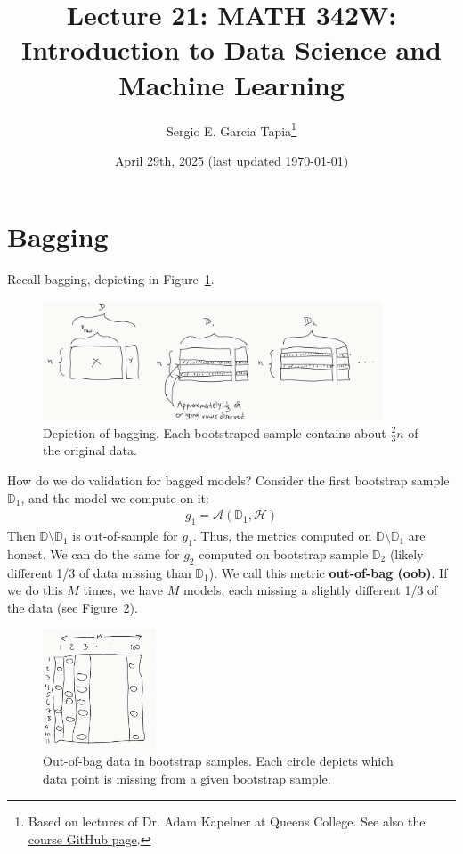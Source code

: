 \documentclass[12pt, a4paper]{article}
\title{Lecture 21: MATH 342W: Introduction to Data Science and Machine Learning}
\author{Sergio E. Garcia Tapia\thanks{Based on lectures of Dr. Adam Kapelner at Queens College.
See also the \href{https://github.com/kapelner/QC_MATH_342W_Spring_2025}{course GitHub page}.}}
\date{April 29th, 2025 (last updated \today)}
\theoremstyle{definition}
\begin{document}
	\maketitle
	\section*{Bagging}
	Recall bagging, depicting in Figure~\ref{fig:bagging}.
	\begin{figure}
		\centering
		\includegraphics[width=0.9\textwidth]{bagging}
		\caption{Depiction of bagging. Each bootstraped sample contains about $\frac{2}{3}n$ of
		the original data.}
		\label{fig:bagging}
	\end{figure}
	How do we do validation for bagged models? Consider the first bootstrap sample
	$\mathbb{D}_1$, and the model we compute on it:
	\begin{align*}
		g_1 = \mathcal{A}(\mathbb{D}_1, \mathcal{H})
	\end{align*}
	Then $\mathbb{D}\setminus \mathbb{D}_1$ is out-of-sample for $g_1$. Thus,
	the metrics computed on $\mathbb{D}\setminus \mathbb{D}_1$ are honest.
	We can do the same for $g_2$ computed on bootstrap sample $\mathbb{D}_2$
	(likely different 1/3 of data missing than $\mathbb{D}_1$). We call this
	metric \textbf{out-of-bag (oob)}. If we do this $M$ times, we have $M$ models,
	each missing a slightly different 1/3 of the data (see Figure~\ref{fig:oob-data}).
	\begin{figure}
		\centering
		\includegraphics[width=0.3\textwidth]{out-of-bag-data-in-bootstrap-samples}
		\caption{Out-of-bag data in bootstrap samples. Each circle depicts
		which data point is missing from a given bootstrap sample.}
		\label{fig:oob-data}
	\end{figure}
\end{document}
